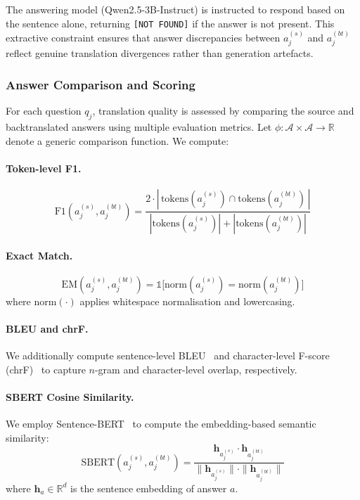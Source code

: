 The answering model (Qwen2.5-3B-Instruct) is instructed to respond based on the sentence alone, returning \texttt{[NOT FOUND]} if the answer is not present. This extractive constraint ensures that answer discrepancies between $a_j^{(s)}$ and $a_j^{(bt)}$ reflect genuine translation divergences rather than generation artefacts.

\subsubsection{Answer Comparison and Scoring}

For each question $q_j$, translation quality is assessed by comparing the source and backtranslated answers using multiple evaluation metrics. Let $\phi : \mathcal{A} \times \mathcal{A} \rightarrow \mathbb{R}$ denote a generic comparison function. We compute:

\paragraph{Token-level F1.}
\begin{equation}
    \text{F1}(a^{(s)}_j, a^{(bt)}_j) = \frac{2 \cdot |\,\text{tokens}(a^{(s)}_j) \cap \text{tokens}(a^{(bt)}_j)\,|}{|\text{tokens}(a^{(s)}_j)| + |\text{tokens}(a^{(bt)}_j)|}
\end{equation}

\paragraph{Exact Match.}
\begin{equation}
    \text{EM}(a^{(s)}_j, a^{(bt)}_j) = \mathbb{1}\big[\text{norm}(a^{(s)}_j) = \text{norm}(a^{(bt)}_j)\big]
\end{equation}
where $\text{norm}(\cdot)$ applies whitespace normalisation and lowercasing.

\paragraph{BLEU and chrF.} We additionally compute sentence-level BLEU~\cite{papineni2002bleu} and character-level F-score (chrF)~\cite{popovic2015chrf} to capture $n$-gram and character-level overlap, respectively.

\paragraph{SBERT Cosine Similarity.} We employ Sentence-BERT~\cite{reimers2019sentence} to compute the embedding-based semantic similarity:
\begin{equation}
    \text{SBERT}(a^{(s)}_j, a^{(bt)}_j) = \frac{\mathbf{h}_{a^{(s)}_j} \cdot \mathbf{h}_{a^{(bt)}_j}}{\|\mathbf{h}_{a^{(s)}_j}\| \cdot \|\mathbf{h}_{a^{(bt)}_j}\|}
\end{equation}
where $\mathbf{h}_a \in \mathbb{R}^d$ is the sentence embedding of answer $a$.

